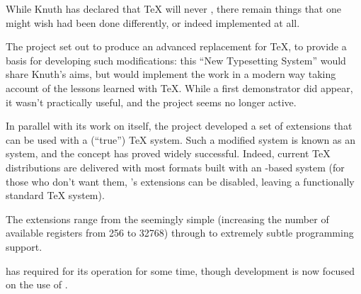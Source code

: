 


%


While Knuth has declared that \TeX{} will never %
, there remain
things that one might wish had been done differently, or indeed
implemented at all.

The  project set out to produce an advanced replacement for
\TeX{}, to provide a basis for developing such modifications: this
``New Typesetting System'' would share Knuth's aims, but would
implement the work in a modern way taking account of the lessons
learned with \TeX{}.  While a first demonstrator  did
appear, it wasn't practically useful, and the project seems no longer
active.

In parallel with its work on  itself, the project developed
a set of extensions that can be used with a (``true'') \TeX{} system.
Such a modified system is known as an \eTeX{} system, and the concept
has proved widely successful.  Indeed, current \TeX{} distributions
are delivered with most formats built with an \eTeX{}-based system (for
those who don't want them, \eTeX{}'s extensions can be disabled, leaving
a functionally standard \TeX{} system).

The extensions range from the seemingly simple (increasing the number
of available registers from 256 to 32768) through to extremely subtle
programming support.

 has required \eTeX{} for its operation
for some time, though development is now focused on the use of
.

